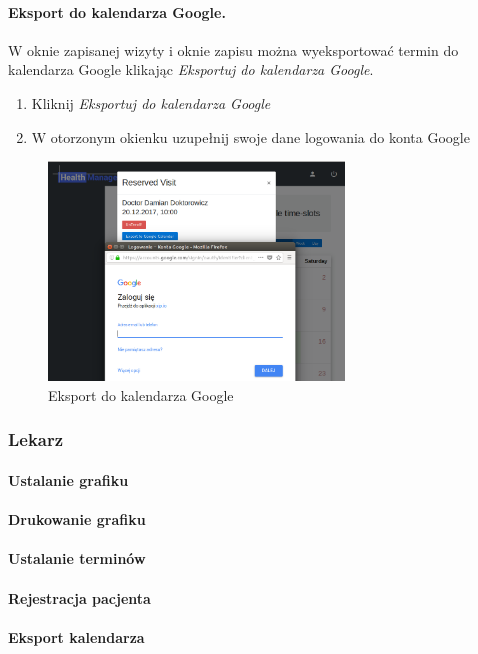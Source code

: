 \documentclass[polish,12pt]{aghthesis}
\begin{document}
    \paragraph{Eksport do kalendarza Google.}{ W oknie zapisanej wizyty i oknie zapisu można wyeksportować termin do kalendarza Google klikając \emph{Eksportuj do kalendarza Google}.
    \begin{enumerate}
      \item Kliknij \emph{Eksportuj do kalendarza Google}
      \item W otorzonym okienku uzupełnij swoje dane logowania do konta Google
    \end{enumerate}
       \begin{figure}[H]
        \includegraphics[width=0.7\textwidth]{gui-google-export}
        \caption{Eksport do kalendarza Google}
        \end{figure}  
    }
\subsubsection{Lekarz}
    \paragraph{Ustalanie grafiku}{}
    \paragraph{Drukowanie grafiku}{}
    \paragraph{Ustalanie terminów}{}
    \paragraph{Rejestracja pacjenta}{}
    \paragraph{Eksport kalendarza}{}
\end{document}
